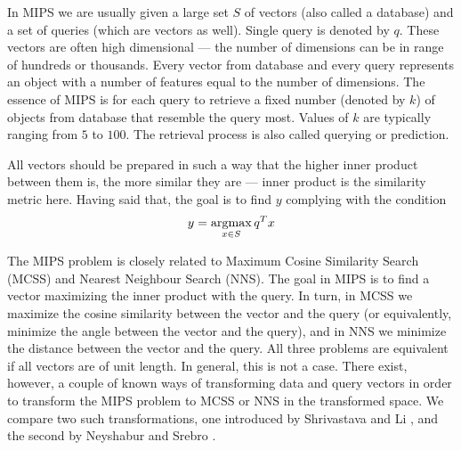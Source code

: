In MIPS we are usually given a large set $S$ of vectors (also called a database) and a set of queries
(which are vectors as well). Single query is denoted by $q$.
These vectors are often high dimensional --- the number of dimensions can be in range of hundreds or thousands.
Every vector from database and every query represents an object with a number of features equal to the number of dimensions.
The essence of MIPS is for each query to retrieve a fixed number (denoted by $k$)
of objects from database that resemble the query most.
Values of $k$ are typically ranging from $5$ to $100$.
The retrieval process is also called querying or prediction.

All vectors should be prepared in such a way that the higher inner product between them is, the more similar they are
 --- inner product is the similarity metric here. Having said that, the goal is to find $y$ complying with the condition
\[ y = \operatorname*{argmax}_{x \in S} q^T x \]


The MIPS problem is closely related to Maximum Cosine
Similarity Search (MCSS) and Nearest Neighbour Search (NNS).
The goal in MIPS is to find a vector maximizing the inner product with the query. In turn, 
in MCSS we maximize the cosine similarity between the vector and the query (or equivalently,
minimize the angle between the vector and the query), and in NNS we minimize the distance between the vector and the query. All three problems are
equivalent if all vectors are of unit length. In general, this is not a case.
There exist, however, a couple of known ways
of transforming data and query vectors in order to transform the MIPS problem to MCSS or NNS in the transformed space. We compare two such 
transformations, one introduced by Shrivastava and Li \cite{alsh}, and the second by
Neyshabur and Srebro \cite{neyshabur}.

